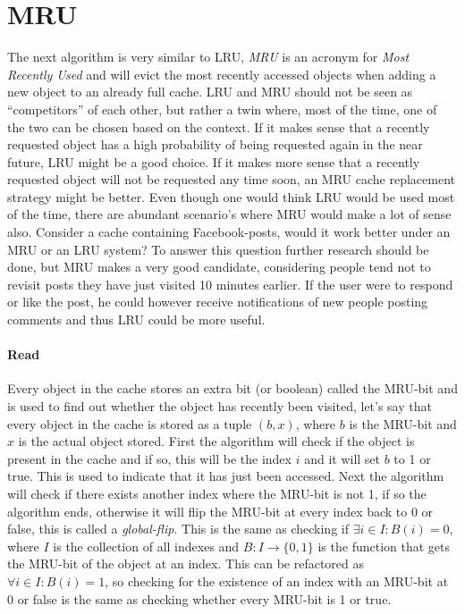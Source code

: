 \documentclass[pdftex,a4paper,12pt,twoside]{report}
\begin{document}
\section{MRU}
The next algorithm is very similar to LRU, \emph{MRU} is an acronym for \emph{Most Recently Used} and will evict the most recently accessed objects when adding a new object to an already full cache. LRU and MRU should not be seen as ``competitors'' of each other, but rather a twin where, most of the time, one of the two can be chosen based on the context.
If it makes sense that a recently requested object has a high probability of being requested again in the near future, LRU might be a good choice. If it makes more sense that a recently requested object will not be requested any time soon, an MRU cache replacement strategy might be better. Even though one would think LRU would be used most of the time, there are abundant scenario's where MRU would make a lot of sense also. Consider a cache containing Facebook-posts, would it work better under an MRU or an LRU system? To answer this question further research should be done, but MRU makes a very good candidate, considering people tend not to revisit posts they have just visited 10 minutes earlier. If the user were to respond or like the post, he could however receive notifications of new people posting comments and thus LRU could be more useful.
\paragraph{Read} Every object in the cache stores an extra bit (or boolean) called the MRU-bit and is used to find out whether the object has recently been visited, let's
say that every object in the cache is stored as a tuple $(b,x)$, where $b$ is the MRU-bit and $x$ is the actual object stored. First the algorithm will check if the object is present in the cache and if so, this will be the index $i$ and it will set $b$ to 1 or true. This is used to indicate that it has just been accessed. Next the algorithm will check if there exists another index where the MRU-bit is not 1, if so the algorithm ends, otherwise it will flip the MRU-bit at every index back to 0 or false, this is called a 
\emph{global-flip}. This is the same as checking if $\exists i \in I : B(i) = 0$, where $I$ is the collection of all indexes and $B : I \to \{0,1\}$ is the function that gets the MRU-bit of the object at an index. This can be refactored as $\forall i \in I : B(i) = 1$, so checking for the existence of an index with an MRU-bit at 0 or false is the same as checking whether every MRU-bit is 1 or true.
\end{document}
